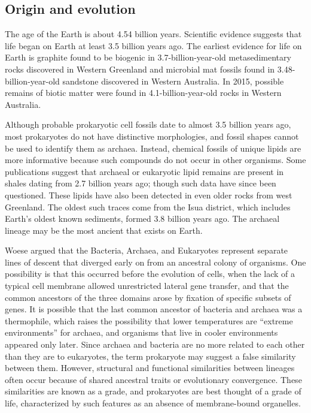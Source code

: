 \hypertarget{origin-and-evolution}{%
\subsection{Origin and evolution}\label{origin-and-evolution}}

The age of the Earth is about 4.54 billion years. Scientific evidence suggests that life began on Earth at least 3.5 billion years ago. The earliest evidence for life on Earth is graphite found to be biogenic in 3.7-billion-year-old metasedimentary rocks discovered in Western Greenland and microbial mat fossils found in 3.48-billion-year-old sandstone discovered in Western Australia. In 2015, possible remains of biotic matter were found in 4.1-billion-year-old rocks in Western Australia.

Although probable prokaryotic cell fossils date to almost 3.5 billion years ago, most prokaryotes do not have distinctive morphologies, and fossil shapes cannot be used to identify them as archaea. Instead, chemical fossils of unique lipids are more informative because such compounds do not occur in other organisms. Some publications suggest that archaeal or eukaryotic lipid remains are present in shales dating from 2.7 billion years ago; though such data have since been questioned. These lipids have also been detected in even older rocks from west Greenland. The oldest such traces come from the Isua district, which includes Earth's oldest known sediments, formed 3.8 billion years ago. The archaeal lineage may be the most ancient that exists on Earth.

Woese argued that the Bacteria, Archaea, and Eukaryotes represent separate lines of descent that diverged early on from an ancestral colony of organisms. One possibility is that this occurred before the evolution of cells, when the lack of a typical cell membrane allowed unrestricted lateral gene transfer, and that the common ancestors of the three domains arose by fixation of specific subsets of genes. It is possible that the last common ancestor of bacteria and archaea was a thermophile, which raises the possibility that lower temperatures are ``extreme environments'' for archaea, and organisms that live in cooler environments appeared only later. Since archaea and bacteria are no more related to each other than they are to eukaryotes, the term prokaryote may suggest a false similarity between them. However, structural and functional similarities between lineages often occur because of shared ancestral traits or evolutionary convergence. These similarities are known as a grade, and prokaryotes are best thought of a grade of life, characterized by such features as an absence of membrane-bound organelles.

